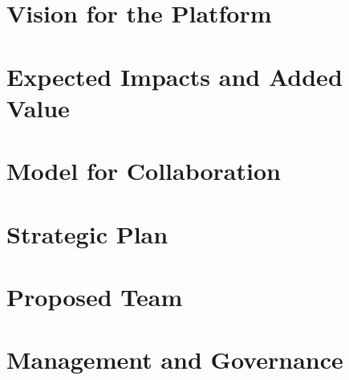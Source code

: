 \documentclass[pdftex,12pt]{article}
\begin{document}
\pagestyle{myheadings}

\section{Vision for the Platform}



\section{Expected Impacts and Added Value}



\section{Model for Collaboration}



\section{Strategic Plan}



\section{Proposed Team}



\section{ Management and Governance }


\end{document}

